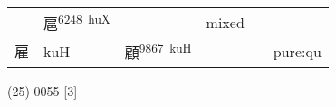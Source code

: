 \documentclass[14pt,a4paper]{scrartcl}
\begin{document}
\begin{longtable}[c]{@{}llllll@{}}
\begin{minipage}[t]{0.14\columnwidth}
\strut\end{minipage} &
\begin{minipage}[t]{0.14\columnwidth}\raggedright\strut
扈\textsuperscript{6248~huX}
\strut\end{minipage} &
\begin{minipage}[t]{0.14\columnwidth}\raggedright\strut
\strut\end{minipage} &
\begin{minipage}[t]{0.14\columnwidth}\raggedright\strut
mixed
\strut\end{minipage}\tabularnewline
\begin{minipage}[t]{0.14\columnwidth}\raggedright\strut
雇
\strut\end{minipage} &
\begin{minipage}[t]{0.14\columnwidth}\raggedright\strut
kuH
\strut\end{minipage} &
\begin{minipage}[t]{0.14\columnwidth}\raggedright\strut
顧\textsuperscript{9867~kuH}
\strut\end{minipage} &
\begin{minipage}[t]{0.14\columnwidth}\raggedright\strut
\strut\end{minipage} &
\begin{minipage}[t]{0.14\columnwidth}\raggedright\strut
\strut\end{minipage} &
\begin{minipage}[t]{0.14\columnwidth}\raggedright\strut
pure:qu
\strut\end{minipage}\tabularnewline
\bottomrule
\end{longtable}

(25) 0055 {[}3{]}
\end{document}
